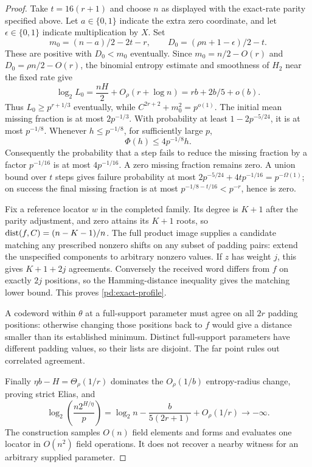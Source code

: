 \begin{proof}
Take $t=16(r+1)$ and choose $n$ as displayed with the exact-rate parity
specified above. Let $a\in\{0,1\}$ indicate the extra zero coordinate,
and let $\epsilon\in\{0,1\}$ indicate multiplication by $X$. Set
\[
 m_0=(n-a)/2-2t-r,\qquad
 D_0=(\rho n+1-\epsilon)/2-t.
\]
These are positive with $D_0<m_0$ eventually. Since
$m_0=n/2-O(r)$ and $D_0=\rho n/2-O(r)$, the binomial entropy estimate
and smoothness of $H_2$ near the fixed rate give
\[
 \log_2 L_0=\frac{nH}{2}+O_\rho(r+\log n)
 =rb+2b/5+o(b).
\]
Thus $L_0\ge p^{r+1/3}$ eventually, while
$C^{2r+2}+m_0^2=p^{o(1)}$. The initial mean missing fraction is at most
$2p^{-1/3}$. With probability at least $1-2p^{-5/24}$, it is at most
$p^{-1/8}$. Whenever $h\le p^{-1/8}$, for sufficiently large $p$,
\[
 \Phi(h)\le4p^{-1/8}h.
\]
Consequently the probability that a step fails to reduce the missing
fraction by a factor $p^{-1/16}$ is at most $4p^{-1/16}$.
A zero missing fraction remains zero. A union bound over $t$ steps
gives failure probability at most
$2p^{-5/24}+4tp^{-1/16}=p^{-\Omega(1)}$; on success the final missing
fraction is at most $p^{-1/8-t/16}<p^{-r}$, hence is zero.

Fix a reference locator $w$ in the completed family. Its degree is
$K+1$ after the parity adjustment, and zero attains its $K+1$ roots,
so $\operatorname{dist}(f,C)=(n-K-1)/n$. The full product image supplies a candidate
matching any prescribed nonzero shifts on any subset of padding pairs:
extend the unspecified components to arbitrary nonzero values. If
$z$ has weight $j$, this gives $K+1+2j$ agreements. Conversely the
received word differs from $f$ on exactly $2j$ positions, so the
Hamming-distance inequality gives the matching lower bound. This
proves \eqref{pd:exact-profile}.

A codeword within $\theta$ at a full-support parameter must agree on
all $2r$ padding positions: otherwise changing those positions back to
$f$ would give a distance smaller than its established minimum.
Distinct full-support parameters have different padding values, so
their lists are disjoint. The far point rules out correlated agreement.

Finally $\eta b-H=\Theta_\rho(1/r)$ dominates the
$O_\rho(1/b)$ entropy-radius change, proving strict Elias, and
\[
 \log_2\left(\frac{n2^{H/\eta}}p\right)
 =\log_2n-\frac{b}{5(2r+1)}+O_\rho(1/r)\longrightarrow-\infty.
\]
The construction samples $O(n)$ field elements and forms and evaluates
one locator in $O(n^2)$ field operations. It does not recover a nearby
witness for an arbitrary supplied parameter.
\end{proof}

